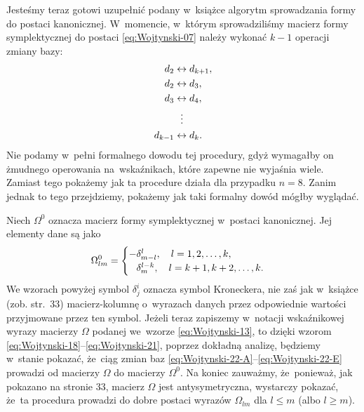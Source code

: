 \documentclass[a4paper,11pt]{article}
\begin{document}
Jesteśmy teraz gotowi uzupełnić podany w~książce algorytm sprowadzania
formy do postaci kanonicznej. W~momencie, w~którym sprowadziliśmy macierz
formy symplektycznej do postaci \eqref{eq:Wojtynski-07} należy wykonać
$k - 1$ operacji zmiany bazy:
\begin{subequations}
  \begin{align}
    \label{eq:Wojtynski-22-A}
    d_{ 2 } &\leftrightarrow d_{ k + 1 }, \\
    \label{eq:Wojtynski-22-B}
    d_{ 2 } &\leftrightarrow d_{ 3 }, \\
    \label{eq:Wojtynski-22-C}
    d_{ 3 } &\leftrightarrow d_{ 4 }, \\
    \label{eq:Wojtynski-22-D}
    &\hspace{0.65em} \vdots \\
    \label{eq:Wojtynski-22-E}
    d_{ k - 1 } &\leftrightarrow d_{ k }.
  \end{align}
\end{subequations}
Nie podamy w~pełni formalnego dowodu tej procedury, gdyż wymagałby on
żmudnego operowania na~wskaźnikach, które zapewne nie wyjaśnia wiele.
Zamiast tego pokażemy jak ta procedure działa dla przypadku $n = 8$.
Zanim jednak to tego przejdziemy, pokażemy jak taki formalny dowód mógłby
wyglądać.

Niech $\Omega^{ 0 }$ oznacza macierz formy symplektycznej w~postaci kanonicznej.
Jej elementy dane są jako
\begin{equation}
  \label{eq:Wojtynski-23}
  \Omega^{ 0 }_{ l m } =
  \begin{cases}
    -\delta^{ l }_{ m - l }, \quad l = 1, 2, \ldots, k, \\
    \hphantom{-} \delta^{ l - k }_{ m }, \quad l = k + 1, k + 2, \ldots, k.
  \end{cases}
\end{equation}
We wzorach powyżej symbol $\delta^{ i }_{ j }$ oznacza symbol Kroneckera, nie zaś
jak w~książce (zob. str.~33) macierz-kolumnę o~wyrazach danych przez
odpowiednie wartości przyjmowane przez ten symbol. Jeżeli teraz zapiszemy
w~notacji wskaźnikowej wyrazy macierzy $\Omega$ podanej we~wzorze
\eqref{eq:Wojtynski-13}, to dzięki wzorom
\eqref{eq:Wojtynski-18}--\eqref{eq:Wojtynski-21}, poprzez
dokładną analizę, będziemy w~stanie pokazać, że~ciąg zmian baz
\eqref{eq:Wojtynski-22-A}--\eqref{eq:Wojtynski-22-E} prowadzi od macierzy
$\Omega$ do macierzy $\Omega^{ 0 }$. Na koniec zauważmy, że~ponieważ, jak pokazano na
stronie 33, macierz $\Omega$ jest antysymetryczna, wystarczy pokazać, że~ta
procedura prowadzi do dobre postaci wyrazów $\Omega_{ l m }$ dla $l \leq m$ (albo
$l \geq m$).
\end{document}
